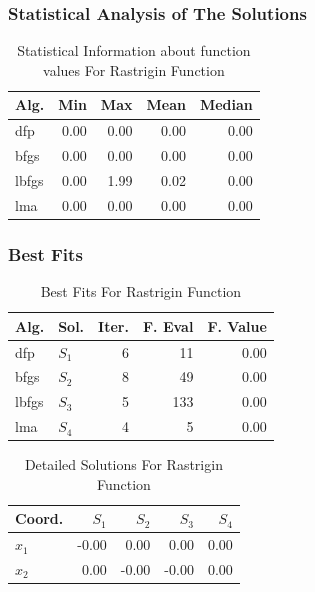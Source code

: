 \documentclass[conference]{IEEEtran}
\begin{document}
\subsubsection{Statistical Analysis of The Solutions}
\label{statisticalanalysisrastrigin2d2D}

\begin{table}[H]
\centering
\caption{Statistical Information about function values For Rastrigin Function}
\label{function_values:rastrigin2d}
\begin{tabular}{lrrrr}
\toprule
 Alg. &  Min &  Max &  Mean &  Median \\
\midrule
  dfp & 0.00 & 0.00 &  0.00 &    0.00 \\
 bfgs & 0.00 & 0.00 &  0.00 &    0.00 \\
lbfgs & 0.00 & 1.99 &  0.02 &    0.00 \\
  lma & 0.00 & 0.00 &  0.00 &    0.00 \\
\bottomrule
\end{tabular}
\end{table}

\subsubsection{Best Fits}
\label{bestfitsrastrigin2d2D}

\begin{table}[H]
\centering
\caption{Best Fits For Rastrigin Function}
\label{solutions:rastrigin2d}
\begin{tabular}{llrrr}
\toprule
 Alg. &    Sol. &  Iter. &  F. Eval &  F. Value \\
\midrule
  dfp & $S_{1}$ &      6 &       11 &      0.00 \\
 bfgs & $S_{2}$ &      8 &       49 &      0.00 \\
lbfgs & $S_{3}$ &      5 &      133 &      0.00 \\
  lma & $S_{4}$ &      4 &        5 &      0.00 \\
\bottomrule
\end{tabular}
\end{table}

\begin{table}[H]
\centering
\caption{Detailed Solutions For Rastrigin Function}
\label{detailedsolutions:rastrigin2d}
\begin{tabular}{lrrrr}
\toprule
 Coord. &  $S_{1}$ &  $S_{2}$ &  $S_{3}$ &  $S_{4}$ \\
\midrule
$x_{1}$ &    -0.00 &     0.00 &     0.00 &     0.00 \\
$x_{2}$ &     0.00 &    -0.00 &    -0.00 &     0.00 \\
\bottomrule
\end{tabular}
\end{table}
\end{document}
